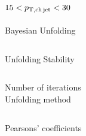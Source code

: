 \documentclass[xcolor={usenames,dvipsnames}, aspectratio=169]{beamer}
\begin{document}
\subsection{$15<p_{\mathrm{T,ch\, jet}}<30$~\GeVc}

\begin{frame}{Bayesian Unfolding}
\begin{columns}
\centering
\centering
\end{columns}
\end{frame}

\begin{frame}{Unfolding Stability}
\begin{columns}
\centering
\tiny 
Number of iterations\\
\centering
\tiny
Unfolding method\\
\end{columns}
\centering
\tiny
Pearsons' coefficients\\
\end{frame}
\end{document}
